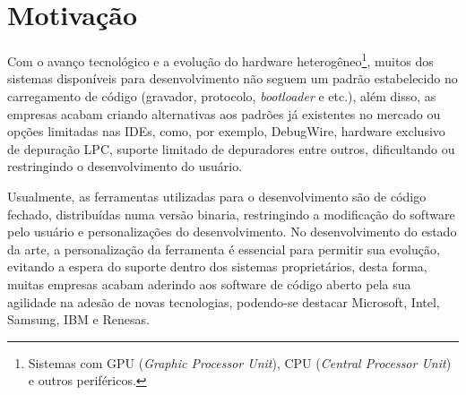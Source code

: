 \section{Motivação}

Com o avanço tecnológico e a evolução do hardware heterogêneo\footnote{Sistemas com GPU (\textit{Graphic Processor Unit}), CPU (\textit{Central Processor Unit}) e outros periféricos.}, muitos dos sistemas disponíveis para desenvolvimento não seguem um padrão estabelecido no carregamento de código (gravador, protocolo, \textit{bootloader} e etc.), além disso, as empresas acabam criando alternativas aos padrões já
 existentes no mercado ou opções limitadas nas IDEs, como, por exemplo, DebugWire\cite{debugwire}, hardware exclusivo de depuração LPC\cite{nxp}, suporte limitado de depuradores\cite{kiledebug} entre outros, dificultando ou restringindo o desenvolvimento do usuário.

Usualmente, as ferramentas utilizadas para o desenvolvimento são de código fechado, distribuídas numa versão binaria, restringindo a modificação do software pelo usuário e personalizações do desenvolvimento. No desenvolvimento do estado da arte, a personalização da ferramenta é essencial para permitir sua evolução, evitando a espera do suporte dentro dos sistemas proprietários, desta forma, muitas empresas acabam aderindo aos software de código aberto pela sua agilidade na adesão de novas tecnologias, podendo-se destacar Microsoft\cite{microsoftn1}, Intel, Samsung, IBM e Renesas\cite{topskernel}.


\iffalse
\subsubsection{Ferramentas proprietárias}

Pela falta de um padrão definido, muitas empresas resolveram criar seus próprios, fundamentados em seus interesses ou na suas definições de utilização do que deveria ou não conter em suas soluções. Como consequência disso, são criados visões limitadas da realidade, resultante do modo de atuação interno vivida pela empresa, pela sua falta de conhecimento da realidade atual do mercado e suas utilizações.

Como consequência disso, a gama de padrões de protocolos de comunicação, \textit{bootloaders}, ICSPs, compiladores e outros materiais utilizados no desenvolvimento de sistemas embarcados, dificulta a realização do trabalho do desenvolvedor, principalmente se tais periféricos utilizados tem documentação e código fonte fechados, não permitindo seu conhecimento de funcionamento.
\fi

